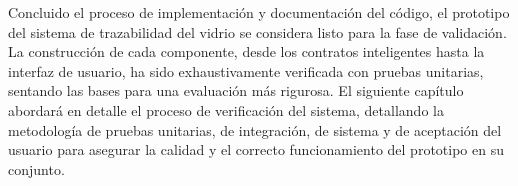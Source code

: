 Concluido el proceso de implementación y documentación del código, el prototipo del sistema de trazabilidad del vidrio se considera listo para la fase de validación. La construcción de cada componente, desde los contratos inteligentes hasta la interfaz de usuario, ha sido exhaustivamente verificada con pruebas unitarias, sentando las bases para una evaluación más rigurosa. El siguiente capítulo abordará en detalle el proceso de verificación del sistema, detallando la metodología de pruebas unitarias, de integración, de sistema y de aceptación del usuario para asegurar la calidad y el correcto funcionamiento del prototipo en su conjunto.
